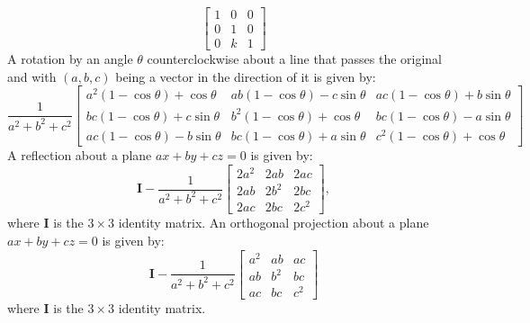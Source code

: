 \documentclass[a4paper,12pt]{report}
\begin{document}
\[\begin{bmatrix}
1 & 0 & 0 \\
0 & 1 & 0 \\
0 & k & 1
\end{bmatrix}\]
A rotation by an angle $\theta$ counterclockwise about a line that passes the original and with $(a,b,c)$ being a vector in the direction of it is given by:
\[\frac{1}{a^2+b^2+c^2}\begin{bmatrix}
a^2(1-\cos\theta)+\cos\theta & ab(1-\cos\theta)-c\sin\theta & ac(1-\cos\theta )+b\sin\theta\\
bc(1-\cos\theta )+c\sin\theta & b^2(1-\cos\theta )+\cos\theta & bc(1-\cos\theta )-a\sin\theta\\
ac(1-\cos\theta )-b\sin\theta & bc(1-\cos\theta )+a\sin\theta & c^2(1-\cos\theta )+\cos\theta \end{bmatrix}\]
A reflection about a plane $ax+by+cz=0$ is given by:
\[\mathbf{I}-\frac{1}{a^2+b^2+c^2}\begin{bmatrix}
2a^2 & 2ab & 2ac \\
2ab & 2b^2 & 2bc \\
2ac & 2bc & 2c^2
\end{bmatrix},\]
where $\mathbf{I}$ is the $3\times 3$ identity matrix.
An orthogonal projection about a plane $ax+by+cz=0$ is given by:
\[\mathbf{I}-\frac{1}{a^2 + b^2 + c^2}\begin{bmatrix}
a^2 & ab & ac \\
ab & b^2 & bc \\
ac & bc & c^2
\end{bmatrix}\]
where $\mathbf{I}$ is the $3\times 3$ identity matrix.
\end{document}
